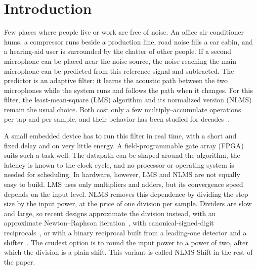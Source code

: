 \providecommand{\decl}[1]{\noindent\textbf{#1.}\ } %
\section{Introduction}
Few places where people live or work are free of noise. An office air conditioner hums, a compressor runs
beside a production line, road noise fills a car cabin, and a hearing-aid user is surrounded by the
chatter of other people. If a second microphone can be placed near the noise source, the noise reaching
the main microphone can be predicted from this reference signal and subtracted. The predictor is an
adaptive filter: it learns the acoustic path between the two microphones while the system runs and
follows the path when it changes. For this filter, the least-mean-square (LMS) algorithm and its
normalized version (NLMS) remain the usual choice. Both cost only a few multiply--accumulate operations per
tap and per sample, and their behavior has been studied for decades~\cite{lu2021a}.

A small embedded device has to run this filter in real time, with a short and fixed delay and on very
little energy. A field-programmable gate array (FPGA) suits such a task well. The datapath can be shaped
around the algorithm, the latency is known to the clock cycle, and no processor or operating system is
needed for scheduling. In hardware, however, LMS and NLMS are not equally easy to build. LMS uses only
multipliers and adders, but its convergence speed depends on the input level. NLMS removes this
dependence by dividing the step size by the input power, at the price of one division per sample.
Dividers are slow and large, so recent designs approximate the division instead, with an approximate
Newton--Raphson iteration~\cite{guidotti2020}, with canonical-signed-digit reciprocals~\cite{yao2024}, or
with a binary reciprocal built from a leading-one detector and a shifter~\cite{huang2026}. The crudest
option is to round the input power to a power of two, after which the division is a plain shift. This
variant is called NLMS-Shift in the rest of the paper.

